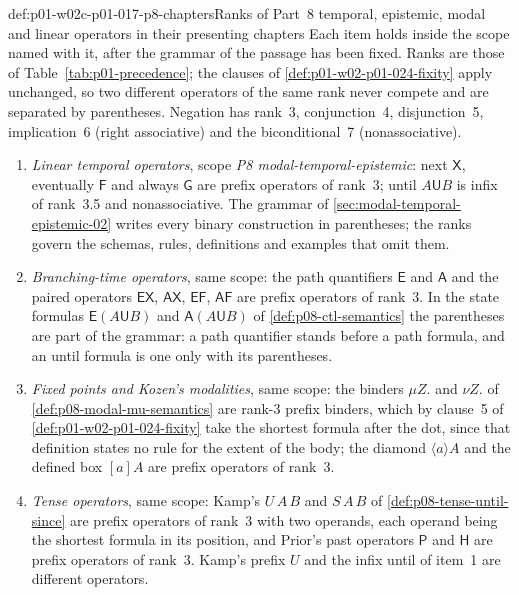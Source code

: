 \begin{hbconvention}{def:p01-w02c-p01-017-p8-chapters}{Ranks of Part~8 temporal, epistemic, modal and linear operators in their presenting chapters}
Each item holds inside the scope named with it, after the grammar of the
passage has been fixed.  Ranks are those of
Table~\ref{tab:p01-precedence}; the clauses of
\cref{def:p01-w02-p01-024-fixity} apply unchanged, so two different
operators of the same rank never compete and are separated by
parentheses.  Negation has rank~3, conjunction~4, disjunction~5,
implication~6 (right associative) and the biconditional~7
(nonassociative).
\begin{enumerate}
\item \emph{Linear temporal operators}, scope \emph{P8
  modal-temporal-epistemic}: next \(\mathsf X\), eventually \(\mathsf F\)
  and always \(\mathsf G\) are prefix operators of rank~3; until
  \(A\mathbin{\mathsf U}B\) is infix of rank~3.5 and nonassociative.  The
  grammar of \cref{sec:modal-temporal-epistemic-02} writes every binary
  construction in parentheses; the ranks govern the schemas, rules,
  definitions and examples that omit them.
\item \emph{Branching-time operators}, same scope: the path quantifiers
  \(\mathsf E\) and \(\mathsf A\) and the paired operators
  \(\mathsf{EX}\), \(\mathsf{AX}\), \(\mathsf{EF}\), \(\mathsf{AF}\) are
  prefix operators of rank~3.  In the state formulas
  \(\mathsf E(A\mathbin{\mathsf U}B)\) and
  \(\mathsf A(A\mathbin{\mathsf U}B)\) of
  \cref{def:p08-ctl-semantics} the parentheses are part of the grammar:
  a path quantifier stands before a path formula, and an until formula
  is one only with its parentheses.
\item \emph{Fixed points and Kozen's modalities}, same scope: the
  binders \(\mu Z.\) and \(\nu Z.\) of \cref{def:p08-modal-mu-semantics}
  are rank-3 prefix binders, which by clause~5 of
  \cref{def:p01-w02-p01-024-fixity} take the shortest formula after the
  dot, since that definition states no rule for the extent of the body;
  the diamond \(\langle a\rangle A\) and the defined box \([a]A\) are
  prefix operators of rank~3.
\item \emph{Tense operators}, same scope: Kamp's \(U\,A\,B\) and
  \(S\,A\,B\) of \cref{def:p08-tense-until-since} are prefix operators of
  rank~3 with two operands, each operand being the shortest formula in
  its position, and Prior's past operators \(\mathsf P\) and
  \(\mathsf H\) are prefix operators of rank~3.  Kamp's prefix \(U\) and
  the infix until of item~1 are different operators.

\end{enumerate}
\end{hbconvention}
